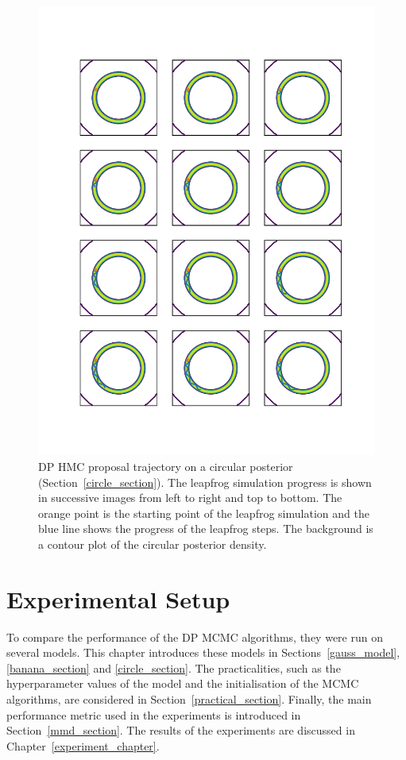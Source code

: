 \documentclass[english,twoside,openright]{HYgraduMLDS}
\begin{document}
\begin{figure}[h]
	\centering
  \includegraphics[width=\textwidth]{figures/hmc_trajectory}
  \caption{
    DP HMC proposal trajectory on a circular posterior
    (Section~\ref{circle_section}). The leapfrog simulation progress is shown
    in successive images from left to right and top to bottom.
    The orange point is the starting
    point of the leapfrog simulation and the blue line shows the progress
    of the leapfrog steps. The background is a contour plot of the circular
    posterior density.
  }
  \label{hmc_trajectory_fig}
\end{figure}

\chapter{Experimental Setup}\label{experiment_setup_chapter}

To compare the performance of the DP MCMC algorithms, they were run on
several models. This chapter introduces these models in Sections~\ref{gauss_model},
\ref{banana_section} and \ref{circle_section}. The practicalities, such as
the hyperparameter values of the model and the initialisation of the
MCMC algorithms, are considered in Section~\ref{practical_section}.
Finally, the main performance
metric used in the experiments is introduced in Section~\ref{mmd_section}.
The results of the experiments are discussed in Chapter~\ref{experiment_chapter}.
\end{document}
